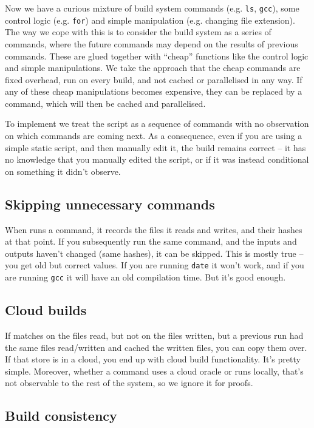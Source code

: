 Now we have a curious mixture of build system commands (e.g. \texttt{ls}, \texttt{gcc}), some control logic (e.g. \texttt{for}) and simple manipulation (e.g. changing file extension). The way we cope with this is to consider the build system as a series of commands, where the future commands may depend on the results of previous commands. These are glued together with ``cheap'' functions like the control logic and simple manipulations. We take the approach that the cheap commands are fixed overhead, run on every build, and not cached or parallelised in any way. If any of these cheap manipulations becomes expensive, they can be replaced by a command, which will then be cached and parallelised.

To implement \Rattle we treat the script as a sequence of commands with no observation on which commands are coming next. As a consequence, even if you are using a simple static script, and then manually edit it, the \Rattle build remains correct -- it has no knowledge that you manually edited the script, or if it was instead conditional on something it didn't observe.

\subsection{Skipping unnecessary commands}

When \Rattle runs a command, it records the files it reads and writes, and their hashes at that point. If you subsequently run the same command, and the inputs and outputs haven't changed (same hashes), it can be skipped. This is mostly true -- you get old but correct values. If you are running \texttt{date} it won't work, and if you are running \texttt{gcc} it will have an old compilation time. But it's good enough.

\subsection{Cloud builds}

If \Rattle matches on the files read, but not on the files written, but a previous run had the same files read/written and cached the written files, you can copy them over. If that store is in a cloud, you end up with cloud build functionality. It's pretty simple. Moreover, whether a command uses a cloud oracle or runs locally, that's not observable to the rest of the system, so we ignore it for proofs.

\subsection{Build consistency}

